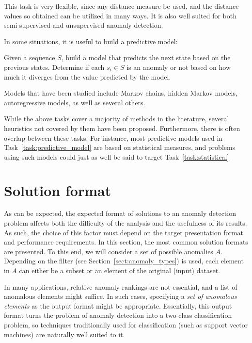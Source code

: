 This task is very flexible, since any distance measure be used, and the distance values so obtained can be utilized in many ways. It is also well suited for both semi-supervised and unsupervised anomaly detection.

In some situations, it is useful to build a predictive model:
\begin{task}
\label{task:predictive_model}
  Given a sequence $S$, build a model that predicts the next state based on the previous states. Determine if each $s_i \in S$ is an anomaly or not based on how much it diverges from the value predicted by the model.
\end{task}
Models that have been studied include Markov chains, hidden Markov models, autoregressive models, as well as several others.

While the above tasks cover a majority of methods in the literature, several heuristics not covered by them have been proposed. Furthermore, there is often overlap between these tasks. For instance, most predictive models used in Task~\ref{task:predictive_model} are based on statistical measures, and problems using such models could just as well be said to target Task~\ref{task:statistical}

\section{Solution format}
\label{sect:output_format}

As can be expected, the expected format of solutions to an anomaly detection problem affects both the difficulty of the analysis and the usefulness of its results. As such, the choice of this factor must depend on the target presentation format and performance requirements. In this section, the most common solution formats are presented. To this end, we will consider a set of possible anomalies $A$. Depending on the filter (see Section~\ref{sect:anomaly_types}) is used, each element in $A$ can either be a subset or an element of the original (input) dataset.

In many applications, relative anomaly rankings are not essential, and a list of anomalous elements might suffice. In such cases, specifying a \emph{set of anomalous elements} as the output format might be appropriate. Essentially, this output format turns the problem of anomaly detection into a two-class classification problem, so techniques traditionally used for classification (such as support vector machines) are naturally well suited to it.

